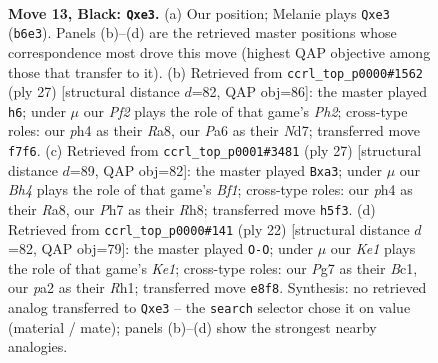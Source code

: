 \documentclass[11pt]{article}
\begin{document}
\clearpage

\begin{figure}[p]\centering
\begin{subfigure}{0.46\textwidth}\centering
\resizebox{\linewidth}{!}{%
\newchessgame
\chessboard[
  setfen={rn2k1nr/1p3ppp/pq6/3QP2b/7P/1P2PN2/P3B1P1/RN2K2R b KQkq - 0 13},
  showmover=false,
  pgfstyle=straightmove, color=movearrow, markmove={b6-e3}
]}
\caption{}
\end{subfigure}\hfill
\begin{subfigure}{0.46\textwidth}\centering
\resizebox{\linewidth}{!}{%
\newchessgame
\chessboard[
  setfen={r3kb1r/3npppp/p1pq4/6B1/P2PQ3/2P2N2/5PPP/R3K2R b KQkq - 0 14},
  showmover=false,
  pgfstyle=straightmove, color=movearrow, markmove={h7-h6}
]}
\caption{}
\end{subfigure}
\\[4pt]
\begin{subfigure}{0.46\textwidth}\centering
\resizebox{\linewidth}{!}{%
\newchessgame
\chessboard[
  setfen={r3kb1r/1p3ppp/p1n5/q3p1B1/P3Q3/N1P5/1P3PPP/R3K2R b KQkq - 0 14},
  showmover=false,
  pgfstyle=straightmove, color=movearrow, markmove={f8-a3}
]}
\caption{}
\end{subfigure}\hfill
\begin{subfigure}{0.46\textwidth}\centering
\resizebox{\linewidth}{!}{%
\newchessgame
\chessboard[
  setfen={r3kb1r/p1q2ppp/2p2n2/3p4/Q3P3/8/PP1N1PPP/R1B1K2R w KQkq - 0 12},
  showmover=false,
  pgfstyle=straightmove, color=movearrow, markmove={e1-g1}
]}
\caption{}
\end{subfigure}
\caption{\textbf{Move 13, Black: \texttt{Qxe3}.} (a) Our position; Melanie plays \texttt{Qxe3} (\texttt{b6e3}). Panels (b)--(d) are the retrieved master positions whose correspondence most drove this move (highest QAP objective among those that transfer to it). (b) Retrieved from \texttt{ccrl\_top\_p0000\#1562} (ply 27) [structural distance $d$=82, QAP obj=86]: the master played \texttt{h6}; under $\mu$ our \emph{Pf2} plays the role of that game's \emph{Ph2}; cross-type roles: our \emph{p}h4 as their \emph{R}a8, our \emph{P}a6 as their \emph{N}d7; transferred move \texttt{f7f6}. (c) Retrieved from \texttt{ccrl\_top\_p0001\#3481} (ply 27) [structural distance $d$=89, QAP obj=82]: the master played \texttt{Bxa3}; under $\mu$ our \emph{Bh4} plays the role of that game's \emph{Bf1}; cross-type roles: our \emph{p}h4 as their \emph{R}a8, our \emph{P}h7 as their \emph{R}h8; transferred move \texttt{h5f3}. (d) Retrieved from \texttt{ccrl\_top\_p0000\#141} (ply 22) [structural distance $d$=82, QAP obj=79]: the master played \texttt{O-O}; under $\mu$ our \emph{Ke1} plays the role of that game's \emph{Ke1}; cross-type roles: our \emph{P}g7 as their \emph{B}c1, our \emph{p}a2 as their \emph{R}h1; transferred move \texttt{e8f8}. Synthesis: no retrieved analog transferred to \texttt{Qxe3} -- the \texttt{search} selector chose it on value (material / mate); panels (b)--(d) show the strongest nearby analogies.}
\label{fig:thought-m25}
\end{figure}
\end{document}

